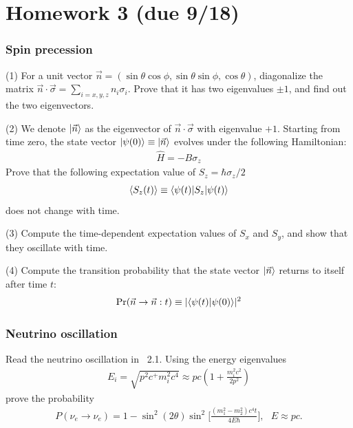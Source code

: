 \chapter{Homework 3 (due 9/18)}


\subsection{Spin precession}

(1) For a unit vector $\vec n=(\sin\theta\cos\phi,\sin\theta\sin\phi,\cos\theta)$, diagonalize the matrix $\vec n\cdot\vec\sigma=\sum_{i=x,y,z}n_i\sigma_i$. Prove that it has two eigenvalues $\pm1$, and find out the two eigenvectors. 

(2) We denote $|{\vec n}\rangle$ as the eigenvector of $\vec n\cdot\vec\sigma$ with eigenvalue $+1$. Starting from time zero, the state vector $|{\psi(0)}\rangle\equiv|{\vec n}\rangle$ evolves under the following Hamiltonian:
\begin{align}
\hat H=-B\sigma_z
\end{align}
Prove that the following expectation value of $S_z=\hbar\sigma_z/2$ 
\begin{align}
\langle{S_z(t)}\rangle\equiv\langle{\psi(t)|S_z|\psi(t)}\rangle
\end{align}
does not change with time. 

(3) Compute the time-dependent expectation values of $S_x$ and $S_y$, and show that they oscillate with time. 

(4) Compute the transition probability that the state vector $|{\vec n}\rangle$ returns to itself after time $t$:
\begin{align}
\text{Pr}(\vec n\rightarrow\vec n:t)\equiv|\langle{\psi(t)|\psi(0)}\rangle|^2
\end{align}

\subsection{Neutrino oscillation}

Read the neutrino oscillation in \sakurai~2.1. Using the energy eigenvalues
\begin{align}
E_i=\sqrt{p^2c^+m_i^2c^4}\approx pc(1+\frac{m_i^2c^2}{2p^2})
\end{align}
prove the probability
\begin{align}
P(\nu_e\rightarrow\nu_e)=1-\sin^2(2\theta)\sin^2\big[\frac{(m_1^2-m_2^2)c^4t}{4E\hbar}\big],~~~E\approx pc.
\end{align}

